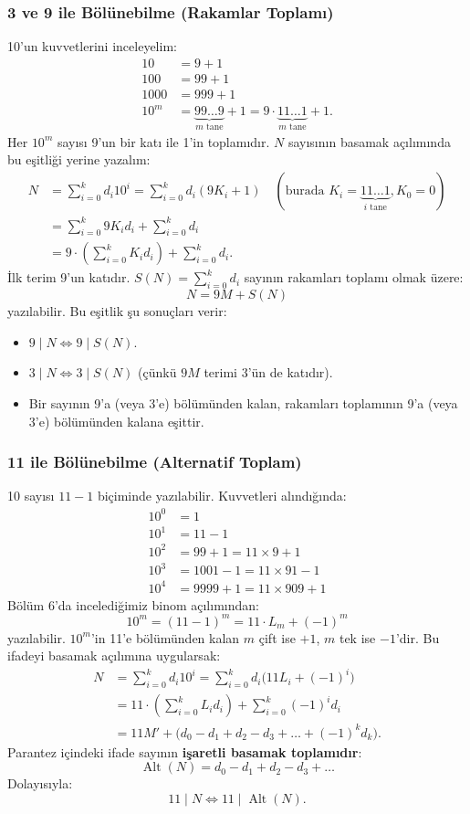 \subsubsection{3 ve 9 ile Bölünebilme (Rakamlar Toplamı)}
10'un kuvvetlerini inceleyelim:
\begin{align*}
10 &= 9 + 1 \\
100 &= 99 + 1 \\
1000 &= 999 + 1 \\
10^m &= \underbrace{99\dots9}_{m \text{ tane}} + 1 = 9 \cdot \underbrace{11\dots1}_{m \text{ tane}} + 1.
\end{align*}
Her $10^m$ sayısı 9'un bir katı ile 1'in toplamıdır. $N$ sayısının basamak açılımında bu eşitliği yerine yazalım:
\begin{align*}
N &= \sum_{i=0}^k d_i 10^i = \sum_{i=0}^k d_i (9 K_i + 1) \quad (\text{burada } K_i = \underbrace{11\dots1}_{i \text{ tane}}, K_0 = 0) \\
&= \sum_{i=0}^k 9 K_i d_i + \sum_{i=0}^k d_i \\
&= 9 \cdot \left(\sum_{i=0}^k K_i d_i\right) + \sum_{i=0}^k d_i.
\end{align*}
İlk terim 9'un katıdır. $S(N) = \sum_{i=0}^k d_i$ sayının rakamları toplamı olmak üzere:
\[
N = 9M + S(N)
\]
yazılabilir. Bu eşitlik şu sonuçları verir:
\begin{itemize}
    \item $9 \mid N \iff 9 \mid S(N)$.
    \item $3 \mid N \iff 3 \mid S(N)$ (çünkü $9M$ terimi 3'ün de katıdır).
    \item Bir sayının 9'a (veya 3'e) bölümünden kalan, rakamları toplamının 9'a (veya 3'e) bölümünden kalana eşittir.
\end{itemize}

\subsubsection{11 ile Bölünebilme (Alternatif Toplam)}
10 sayısı $11 - 1$ biçiminde yazılabilir. Kuvvetleri alındığında:
\begin{align*}
10^0 &= 1 \\
10^1 &= 11 - 1 \\
10^2 &= 99 + 1 = 11 \times 9 + 1 \\
10^3 &= 1001 - 1 = 11 \times 91 - 1 \\
10^4 &= 9999 + 1 = 11 \times 909 + 1
\end{align*}
Bölüm 6'da incelediğimiz binom açılımından:
\[
10^m = (11 - 1)^m = 11 \cdot L_m + (-1)^m
\]
yazılabilir. $10^m$'in 11'e bölümünden kalan $m$ çift ise $+1$, $m$ tek ise $-1$'dir. Bu ifadeyi basamak açılımına uygularsak:
\begin{align*}
N &= \sum_{i=0}^k d_i 10^i = \sum_{i=0}^k d_i \Big(11 L_i + (-1)^i\Big) \\
&= 11 \cdot \left(\sum_{i=0}^k L_i d_i\right) + \sum_{i=0}^k (-1)^i d_i \\
&= 11 M' + \Big(d_0 - d_1 + d_2 - d_3 + \dots + (-1)^k d_k\Big).
\end{align*}
Parantez içindeki ifade sayının \textbf{işaretli basamak toplamıdır}:
\[
\operatorname{Alt}(N) = d_0 - d_1 + d_2 - d_3 + \dots
\]
Dolayısıyla:
\[
11 \mid N \iff 11 \mid \operatorname{Alt}(N).
\]

